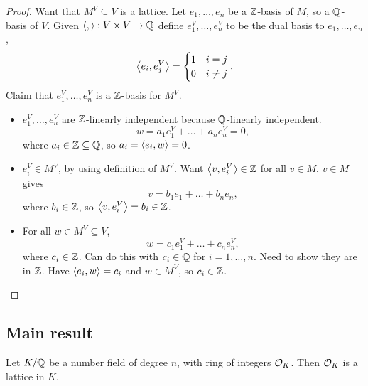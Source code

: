 \begin{proof}
Want that $ M^V \subseteq V $ is a lattice. Let $ e_1, \dots, e_n $ be a $ \mathbb{Z} $-basis of $ M $, so a $ \mathbb{Q} $-basis of $ V $. Given $ \left\langle , \right\rangle : V \times V \to \mathbb{Q} $ define $ e_1^V, \dots, e_n^V $ to be the dual basis to $ e_1, \dots, e_n $,
$$ \left\langle e_i, e_j^V \right\rangle =
\begin{cases}
1 & i = j \\
0 & i \ne j
\end{cases}.
$$
Claim that $ e_1^V, \dots, e_n^V $ is a $ \mathbb{Z} $-basis for $ M^V $.
\begin{itemize}
\item $ e_1^V, \dots, e_n^V $ are $ \mathbb{Z} $-linearly independent because $ \mathbb{Q} $-linearly independent.
$$ w = a_1e_1^V + \dots + a_ne_n^V = 0, $$
where $ a_i \in \mathbb{Z} \subseteq \mathbb{Q} $, so $ a_i = \left\langle e_i, w \right\rangle = 0 $.
\item $ e_i^V \in M^V $, by using definition of $ M^V $. Want $ \left\langle v, e_i^V \right\rangle \in \mathbb{Z} $ for all $ v \in M $. $ v \in M $ gives
$$ v = b_1e_1 + \dots + b_ne_n, $$
where $ b_i \in \mathbb{Z} $, so $ \left\langle v, e_i^V \right\rangle = b_i \in \mathbb{Z} $.
\item For all $ w \in M^V \subseteq V $,
$$ w = c_1e_1^V + \dots + c_ne_n^V, $$
where $ c_i \in \mathbb{Z} $. Can do this with $ c_i \in \mathbb{Q} $ for $ i = 1, \dots, n $. Need to show they are in $ \mathbb{Z} $. Have $ \left\langle e_i, w \right\rangle = c_i $ and $ w \in M^V $, so $ c_i \in \mathbb{Z} $.
\end{itemize}
\end{proof}

\subsection{Main result}

\begin{theorem}
Let $ K / \mathbb{Q} $ be a number field of degree $ n $, with ring of integers $ \mathcal{O}_K $. Then $ \mathcal{O}_K $ is a lattice in $ K $.
\end{theorem}

